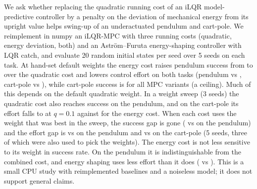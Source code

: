 We ask whether replacing the quadratic running cost of an iLQR model-predictive controller by a penalty on the deviation of mechanical energy from its upright value helps swing-up of an underactuated pendulum and cart-pole. We reimplement in numpy an iLQR-MPC with three running costs (quadratic, energy deviation, both) and an Astr\"om--Furuta energy-shaping controller with LQR catch, and evaluate 20 random initial states per seed over 5 seeds on each task. At hand-set default weights the energy cost raises pendulum success from  to  over the quadratic cost and lowers control effort on both tasks (pendulum  vs , cart-pole  vs ), while cart-pole success is  for all MPC variants (a ceiling). Much of this depends on the default quadratic weight. In a weight sweep (3 seeds) the quadratic cost also reaches success  on the pendulum, and on the cart-pole its effort falls to  at $q=0.1$ against  for the energy cost. When each cost uses the weight that was best in the sweep, the success gap is gone ( vs  on the pendulum) and the effort gap is  vs  on the pendulum and  vs  on the cart-pole (5 seeds, three of which were also used to pick the weights). The energy cost is not less sensitive to its weight in success rate. On the pendulum it is indistinguishable from the combined cost, and energy shaping uses less effort than it does ( vs ). This is a small CPU study with reimplemented baselines and a noiseless model; it does not support general claims.
